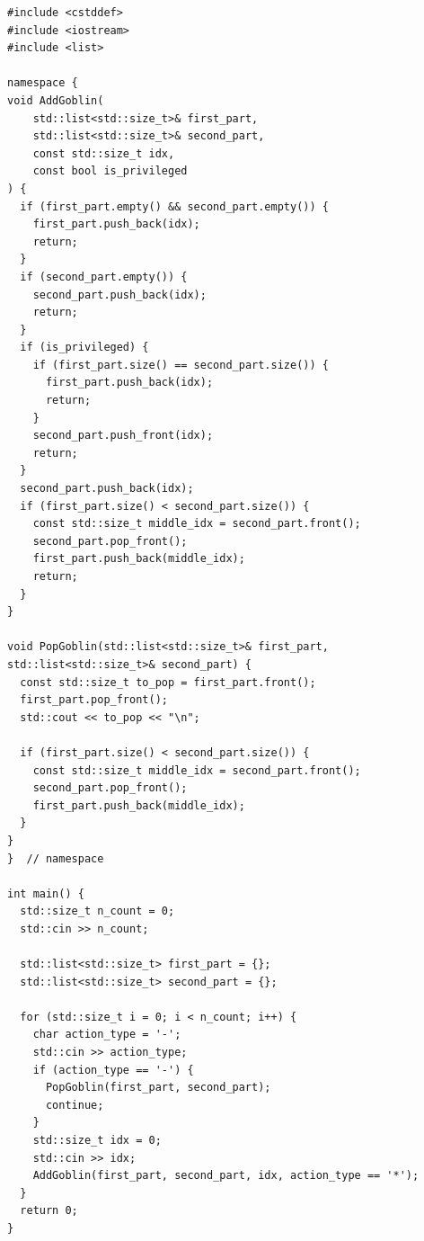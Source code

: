 \begin{lstlisting}
#include <cstddef>
#include <iostream>
#include <list>

namespace {
void AddGoblin(
    std::list<std::size_t>& first_part,
    std::list<std::size_t>& second_part,
    const std::size_t idx,
    const bool is_privileged
) {
  if (first_part.empty() && second_part.empty()) {
    first_part.push_back(idx);
    return;
  }
  if (second_part.empty()) {
    second_part.push_back(idx);
    return;
  }
  if (is_privileged) {
    if (first_part.size() == second_part.size()) {
      first_part.push_back(idx);
      return;
    }
    second_part.push_front(idx);
    return;
  }
  second_part.push_back(idx);
  if (first_part.size() < second_part.size()) {
    const std::size_t middle_idx = second_part.front();
    second_part.pop_front();
    first_part.push_back(middle_idx);
    return;
  }
}

void PopGoblin(std::list<std::size_t>& first_part, std::list<std::size_t>& second_part) {
  const std::size_t to_pop = first_part.front();
  first_part.pop_front();
  std::cout << to_pop << "\n";

  if (first_part.size() < second_part.size()) {
    const std::size_t middle_idx = second_part.front();
    second_part.pop_front();
    first_part.push_back(middle_idx);
  }
}
}  // namespace

int main() {
  std::size_t n_count = 0;
  std::cin >> n_count;

  std::list<std::size_t> first_part = {};
  std::list<std::size_t> second_part = {};

  for (std::size_t i = 0; i < n_count; i++) {
    char action_type = '-';
    std::cin >> action_type;
    if (action_type == '-') {
      PopGoblin(first_part, second_part);
      continue;
    }
    std::size_t idx = 0;
    std::cin >> idx;
    AddGoblin(first_part, second_part, idx, action_type == '*');
  }
  return 0;
}
\end{lstlisting}